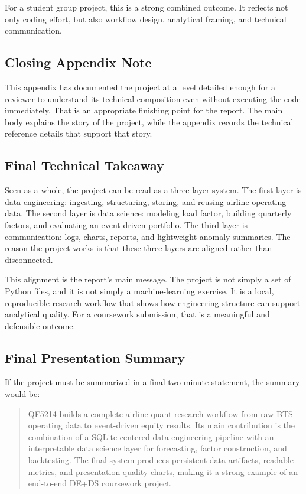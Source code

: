 \documentclass[11pt,a4paper]{article}
\begin{document}
For a student group project, this is a strong combined outcome. It reflects not
only coding effort, but also workflow design, analytical framing, and technical
communication.

\subsection{Closing Appendix Note}

This appendix has documented the project at a level detailed enough for a
reviewer to understand its technical composition even without executing the
code immediately. That is an appropriate finishing point for the report. The
main body explains the story of the project, while the appendix records the
technical reference details that support that story.

\subsection{Final Technical Takeaway}

Seen as a whole, the project can be read as a three-layer system. The first
layer is data engineering: ingesting, structuring, storing, and reusing
airline operating data. The second layer is data science: modeling load factor,
building quarterly factors, and evaluating an event-driven portfolio. The third
layer is communication: logs, charts, reports, and lightweight anomaly
summaries. The reason the project works is that these three layers are aligned
rather than disconnected.

This alignment is the report’s main message. The project is not simply a set of
Python files, and it is not simply a machine-learning exercise. It is a local,
reproducible research workflow that shows how engineering structure can support
analytical quality. For a coursework submission, that is a meaningful and
defensible outcome.

\subsection{Final Presentation Summary}

If the project must be summarized in a final two-minute statement, the summary
would be:

\begin{quote}
QF5214 builds a complete airline quant research workflow from raw BTS operating
data to event-driven equity results. Its main contribution is the combination
of a SQLite-centered data engineering pipeline with an interpretable data
science layer for forecasting, factor construction, and backtesting. The final
system produces persistent data artifacts, readable metrics, and presentation
quality charts, making it a strong example of an end-to-end DE+DS coursework
project.
\end{quote}
\end{document}
